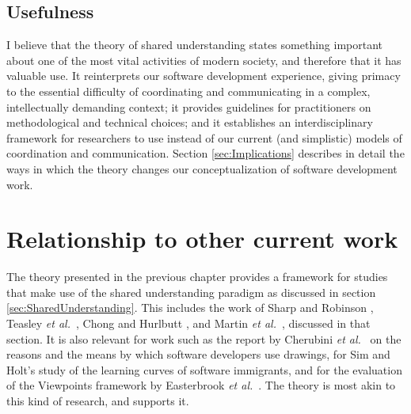 \subsection{Usefulness}

I believe that the theory of shared understanding states something important about one of the most vital activities of modern society, and therefore that it has valuable use. It reinterprets our software development experience, giving primacy to the essential difficulty of coordinating and communicating in a complex, intellectually demanding context; it provides guidelines for practitioners on methodological and technical choices; and it establishes an interdisciplinary framework for researchers to use instead of our current (and simplistic) models of coordination and communication. Section \ref{sec:Implications} describes in detail the ways in which the theory changes our conceptualization of software development work.



\section{Relationship to other current work}

The theory presented in the previous chapter provides a framework for studies that make use of the shared understanding paradigm as discussed in section \ref{sec:SharedUnderstanding}. This includes the work of Sharp and Robinson , Teasley \emph{et al.}\ , Chong and Hurlbutt , and Martin \emph{et al.}\ , discussed in that section. It is also relevant for work such as the report by Cherubini \emph{et al.}\  on the reasons and the means by which software developers use drawings, for Sim and Holt's  study of the learning curves of software immigrants, and for the evaluation of the Viewpoints framework by Easterbrook \emph{et al.}\ . The theory is most akin to this kind of research, and supports it.

